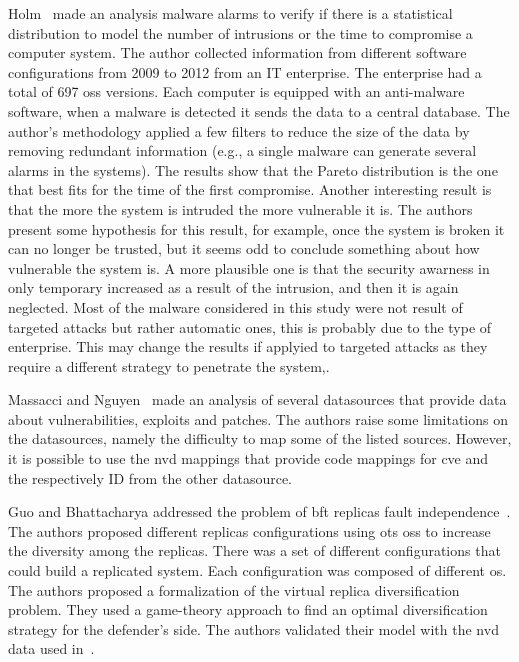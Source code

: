 Holm~\cite{Holm:2014} made an analysis malware alarms to verify if there is a statistical distribution to model the number of intrusions or the time to compromise a computer system.
The author collected information from different software configurations from 2009 to 2012 from an IT enterprise.
The enterprise had a total of 697 \glspl{os} versions.
Each computer is equipped with an anti-malware software, when a malware is detected it sends the data to a central database.
The author's methodology applied a few filters to reduce the size of the data by removing redundant information (e.g., a single malware can generate several alarms in the systems).
The results show that the Pareto distribution is the one that best fits for the time of the first compromise.
Another interesting result is that the more the system is intruded the more vulnerable it is. 
The authors present some hypothesis for this result, for example, once the system is broken it can no longer be trusted, but it seems odd to conclude something about how vulnerable the system is. 
A more plausible one is that the security awarness in only temporary increased as a result of the intrusion, and then it is again neglected.
Most of the malware considered in this study were not result of targeted attacks but rather automatic ones, this is probably due to the type of enterprise. 
This may change the results if applyied to targeted attacks as they require a different strategy to penetrate the system,.


Massacci and Nguyen~\cite{Massacci:2010} made an analysis of several datasources that provide data about vulnerabilities, exploits and patches. 
The authors raise some limitations on the datasources, namely the difficulty to map some of the listed sources. 
However, it is possible to use the \gls{nvd} mappings that provide code mappings for \gls{cve} and the respectively ID from the other datasource.


Guo and Bhattacharya addressed the problem of \gls{bft} replicas fault independence~\cite{Guo:2014}.
The authors proposed different replicas configurations using \gls{ots} \glspl{os} to increase the diversity among the replicas. 
There was a set of different configurations that could build a replicated system. 
Each configuration was composed of different \gls{os}. 
The authors proposed a formalization of the virtual replica diversification problem. 
They used a game-theory approach to find an optimal diversification strategy for the defender's side. 
The authors validated their model with the \gls{nvd} data used in~\cite{Garcia:2012}.

